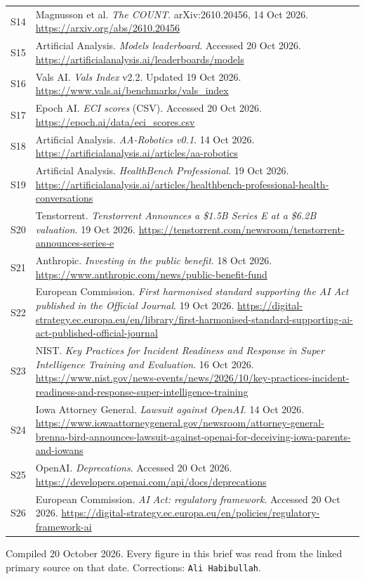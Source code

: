\documentclass[11pt,a4paper]{article}
\newcommand{\briefdate}{20 October 2026}            %
\newcommand{\briefauthor}{Ali Habibullah}          %
\begin{document}
{\begin{tabularx}{\textwidth}{@{}l X@{}}
S14 & Magnusson et al. \emph{The COUNT}. arXiv:2610.20456, 14 Oct 2026. \url{https://arxiv.org/abs/2610.20456} \\
S15 & Artificial Analysis. \emph{Models leaderboard}. Accessed 20 Oct 2026. \url{https://artificialanalysis.ai/leaderboards/models} \\
S16 & Vals AI. \emph{Vals Index} v2.2. Updated 19 Oct 2026. \url{https://www.vals.ai/benchmarks/vals_index} \\
S17 & Epoch AI. \emph{ECI scores} (CSV). Accessed 20 Oct 2026. \url{https://epoch.ai/data/eci_scores.csv} \\
S18 & Artificial Analysis. \emph{AA-Robotics v0.1}. 14 Oct 2026. \url{https://artificialanalysis.ai/articles/aa-robotics} \\
S19 & Artificial Analysis. \emph{HealthBench Professional}. 19 Oct 2026. \url{https://artificialanalysis.ai/articles/healthbench-professional-health-conversations} \\
S20 & Tenstorrent. \emph{Tenstorrent Announces a \$1.5B Series E at a \$6.2B valuation}. 19 Oct 2026. \url{https://tenstorrent.com/newsroom/tenstorrent-announces-series-e} \\
S21 & Anthropic. \emph{Investing in the public benefit}. 18 Oct 2026. \url{https://www.anthropic.com/news/public-benefit-fund} \\
S22 & European Commission. \emph{First harmonised standard supporting the AI Act published in the Official Journal}. 19 Oct 2026. \url{https://digital-strategy.ec.europa.eu/en/library/first-harmonised-standard-supporting-ai-act-published-official-journal} \\
S23 & NIST. \emph{Key Practices for Incident Readiness and Response in Super Intelligence Training and Evaluation}. 16 Oct 2026. \url{https://www.nist.gov/news-events/news/2026/10/key-practices-incident-readiness-and-response-super-intelligence-training} \\
S24 & Iowa Attorney General. \emph{Lawsuit against OpenAI}. 14 Oct 2026. \url{https://www.iowaattorneygeneral.gov/newsroom/attorney-general-brenna-bird-announces-lawsuit-against-openai-for-deceiving-iowa-parents-and-iowans} \\
S25 & OpenAI. \emph{Deprecations}. Accessed 20 Oct 2026. \url{https://developers.openai.com/api/docs/deprecations} \\
S26 & European Commission. \emph{AI Act: regulatory framework}. Accessed 20 Oct 2026. \url{https://digital-strategy.ec.europa.eu/en/policies/regulatory-framework-ai} \\
\bottomrule
\end{tabularx}}

\vspace{0.8em}
{\footnotesize\color{brandgrey}
Compiled \briefdate. Every figure in this brief was read from the linked primary
source on that date. Corrections: \texttt{\briefauthor}.}
\end{document}
